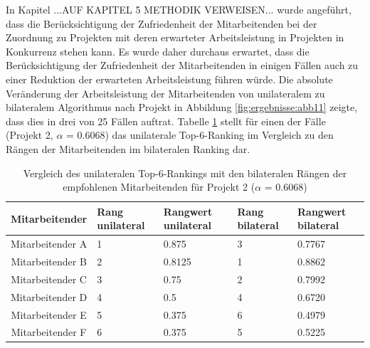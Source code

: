 In Kapitel ...AUF KAPITEL 5 METHODIK VERWEISEN...  wurde angeführt, dass die Berücksichtigung der Zufriedenheit der Mitarbeitenden bei der Zuordnung zu Projekten mit deren erwarteter Arbeitsleistung in Projekten in Konkurrenz stehen kann.
Es wurde daher durchaus erwartet, dass die Berücksichtigung der Zufriedenheit der Mitarbeitenden in einigen Fällen auch zu einer Reduktion der erwarteten Arbeitsleistung führen würde.
Die absolute Veränderung der Arbeitsleistung der Mitarbeitenden von unilateralem zu bilateralem Algorithmus nach Projekt in Abbildung \ref{fig:ergebnisse:abb11} zeigte, dass dies in drei von 25 Fällen auftrat.
Tabelle \ref{tab:diskussion:tab2} stellt für einen der Fälle (Projekt 2, $\alpha$ = 0.6068) das unilaterale Top-6-Ranking im Vergleich zu den Rängen der Mitarbeitenden im bilateralen Ranking dar.

\begin{table}[htbp]
    \begin{center}
    \begin{tabular}{c|p{0.7in}|p{0.7in}|p{0.7in}|p{0.7in}}
    {\textbf{Mitarbeitender}} & {\textbf{Rang unilateral}} & {\textbf{Rangwert unilateral}} & {\textbf{Rang bilateral}} & {\textbf{Rangwert bilateral}} \\
    \hline
	Mitarbeitender A & \hfil1 & \hfil0.875 & \hfil3 & \hfil0.7767 \\
    \hline
    Mitarbeitender B & \hfil2 & \hfil0.8125 & \hfil1 & \hfil0.8862 \\
    \hline
	Mitarbeitender C & \hfil3 & \hfil0.75 & \hfil2 & \hfil0.7992 \\
    \hline
	Mitarbeitender D & \hfil4 & \hfil0.5 & \hfil4 & \hfil0.6720 \\
    \hline
	Mitarbeitender E & \hfil5 & \hfil0.375 & \hfil6 & \hfil0.4979 \\
    \hline
	Mitarbeitender F & \hfil6 & \hfil0.375 & \hfil5 & \hfil0.5225 \\
    \end{tabular}
    \end{center}
    \caption[Vergleich des unilateralen Top-6-Rankings mit den bilateralen Rängen der empfohlenen Mitarbeitenden für Projekt 2 ($\alpha$ = 0.6068)]{Vergleich des unilateralen Top-6-Rankings mit den bilateralen Rängen der empfohlenen Mitarbeitenden für Projekt 2 ($\alpha$ = 0.6068)}
	\label{tab:diskussion:tab2}
\end{table}

